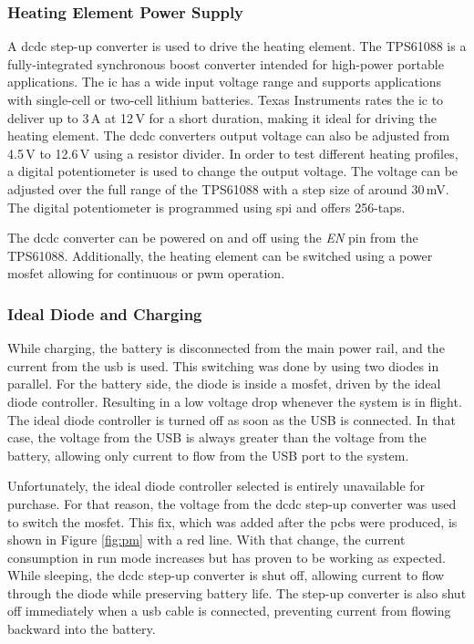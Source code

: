 \subsubsection{Heating Element Power Supply}
A \acrshort{dcdc} step-up converter is used to drive the heating element. The TPS61088 is a fully-integrated synchronous boost converter intended for high-power portable applications. The \acrshort{ic} has a wide input voltage range and supports applications with single-cell or two-cell lithium batteries. Texas Instruments rates the \acrshort{ic} to deliver up to 3\,A at 12\,V for a short duration, making it ideal for driving the heating element. The \acrshort{dcdc} converters output voltage can also be adjusted from 4.5\,V to 12.6\,V using a resistor divider. In order to test different heating profiles, a digital potentiometer is used to change the output voltage. The voltage can be adjusted over the full range of the TPS61088 with a step size of around 30\,mV. The digital potentiometer is programmed using \acrshort{spi} and offers 256-taps. 

The \acrshort{dcdc} converter can be powered on and off using the \textit{EN} pin from the TPS61088. Additionally, the heating element can be switched using a power \acrshort{mosfet} allowing for continuous or \acrshort{pwm} operation.

\subsubsection{Ideal Diode and Charging}
While charging, the battery is disconnected from the main power rail, and the current from the \acrshort{usb} is used. This switching was done by using two diodes in parallel. For the battery side, the diode is inside a \acrshort{mosfet}, driven by the ideal diode controller. Resulting in a low voltage drop whenever the system is in flight. The ideal diode controller is turned off as soon as the USB is connected. In that case, the voltage from the USB is always greater than the voltage from the battery, allowing only current to flow from the USB port to the system. 

Unfortunately, the ideal diode controller selected is entirely unavailable for purchase. For that reason, the voltage from the \acrshort{dcdc} step-up converter was used to switch the \acrshort{mosfet}. This fix, which was added after the \acrshort{pcb}s were produced, is shown in Figure \ref{fig:pm} with a red line. With that change, the current consumption in run mode increases but has proven to be working as expected. While sleeping, the \acrshort{dcdc} step-up converter is shut off, allowing current to flow through the diode while preserving battery life. The step-up converter is also shut off immediately when a \acrshort{usb} cable is connected, preventing current from flowing backward into the battery.  

